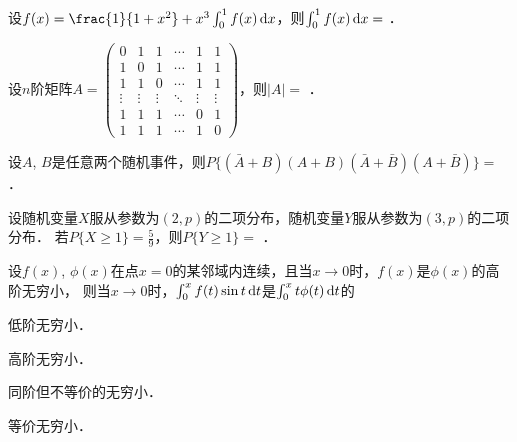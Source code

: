 \documentclass[plain,noanswer,medmath]{../../template/jnuexam}
\begin{document}








\begin{problem}
设$f(x) = \frac{1}{1 + x^2} + x^3\int_0^1f(x)\dx$，则$\int_0^1f(x)\mathop{}\!\mathrm{d} x =$ \fillin{}．
\end{problem}


\begin{problem}
设$n$阶矩阵$A = \begin{pmatrix}
       0 &      1 &      1 & \cdots &      1 & 1 \\
       1 &      0 &      1 & \cdots &      1 & 1 \\
       1 &      1 &      0 & \cdots &      1 & 1 \\
  \vdots & \vdots & \vdots & \ddots & \vdots & \vdots \\
       1 &      1 &      1 & \cdots &      0 & 1 \\
       1 &      1 &      1 & \cdots &      1 & 0
\end{pmatrix}$，则$|A|=$ \fillin{}．
\end{problem}


\begin{problem}
设$A$, $B$是任意两个随机事件，则$P\{(\bar A + B)(A + B)(\bar A + \bar B)(A + \bar B)\} =$ \fillin{}．
\end{problem}


\begin{problem}
设随机变量$X$服从参数为$(2,p)$的二项分布，随机变量$Y$服从参数为$(3,p)$的二项分布．
若$P\{X \ge 1\} = \frac{5}{9}$，则$P\{Y \ge 1\} =$ \fillin{}．
\end{problem}




\begin{problem}
设$f(x)$, $\phi (x)$在点$x = 0$的某邻域内连续，且当$x \to 0$时，$f(x)$是$\phi (x)$的高阶无穷小，
则当$x \to 0$时，$\int_0^x f(t)\sin t\mathop{}\!\mathrm{d} t$是$\int_0^x t\phi(t)\mathop{}\!\mathrm{d} t$的\pickout{}
\begin{abcd}
\item 低阶无穷小．                    
\item 高阶无穷小．
\item 同阶但不等价的无穷小．          
\item 等价无穷小．
\end{abcd}
\end{problem}
\end{document}
